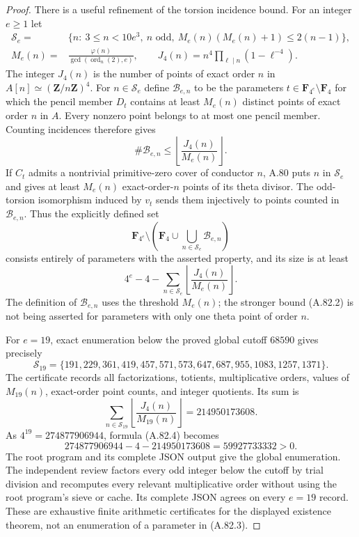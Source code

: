 \documentclass[11pt]{article}
\begin{document}
\begin{proof}
There is a useful refinement of the torsion incidence bound.
For an integer $e\ge1$ let
\[
\begin{split}
 \mathcal S_e={}&\{n:\ 3\le n<10e^3,\ n\text{ odd},\
       M_e(n)(M_e(n)+1)\le2(n-1)\},\\
 M_e(n)={}&\frac{\varphi(n)}{\gcd(\operatorname{ord}_n(2),e)},\qquad
 J_4(n)=n^4\prod_{\ell\mid n}(1-\ell^{-4}).
\end{split}                                                   \tag{A.82.1}
\]
The integer $J_4(n)$ is the number of points of exact order
$n$ in $A[n]\simeq(\mathbf Z/n\mathbf Z)^4$.
For $n\in\mathcal S_e$ define $\mathcal B_{e,n}$ to be
the parameters $t\in\mathbf F_{4^e}\setminus\mathbf F_4$
for which the pencil member $D_t$ contains at least
$M_e(n)$ distinct points of exact order $n$ in $A$.
Every nonzero point belongs to at most one pencil member.
Counting incidences therefore gives
\[
               \#\mathcal B_{e,n}
                  \le\left\lfloor\frac{J_4(n)}{M_e(n)}\right\rfloor.
                                                               \tag{A.82.2}
\]
If $C_t$ admits a nontrivial primitive-zero cover of
conductor $n$, A.80 puts $n$ in $\mathcal S_e$ and gives
at least $M_e(n)$ exact-order-$n$ points of its theta
divisor. The odd-torsion isomorphism induced by $v_t$
sends them injectively to points counted in
$\mathcal B_{e,n}$. Thus the explicitly defined set
\[
 \mathbf F_{4^e}\setminus
       \left(\mathbf F_4\cup
          \bigcup_{n\in\mathcal S_e}\mathcal B_{e,n}\right)
                                                               \tag{A.82.3}
\]
consists entirely of parameters with the asserted property,
and its size is at least
\[
       4^e-4-
       \sum_{n\in\mathcal S_e}
          \left\lfloor\frac{J_4(n)}{M_e(n)}\right\rfloor.
                                                               \tag{A.82.4}
\]
The definition of $\mathcal B_{e,n}$ uses the threshold
$M_e(n)$; the stronger bound (A.82.2) is not being asserted
for parameters with only one theta point of order $n$.

For $e=19$, exact enumeration below the proved global
cutoff $68590$ gives precisely
\[
 \mathcal S_{19}=\{191,229,361,419,457,571,573,647,687,
                         955,1083,1257,1371\}.
\]
The certificate records all factorizations, totients,
multiplicative orders, values of $M_{19}(n)$, exact-order
point counts, and integer quotients. Its sum is
\[
 \sum_{n\in\mathcal S_{19}}
      \left\lfloor\frac{J_4(n)}{M_{19}(n)}\right\rfloor
       =214950173608.
\]
As $4^{19}=274877906944$, formula (A.82.4) becomes
\[
             274877906944-4-214950173608
                     =59927733332>0.
\]
The root program 
and its complete JSON output give the global enumeration.
The independent review
factors every odd integer below the cutoff by trial division
and recomputes every relevant multiplicative order without
using the root program's sieve or cache. Its complete JSON
agrees on every $e=19$ record. These are exhaustive finite
arithmetic certificates for the displayed existence theorem,
not an enumeration of a parameter in (A.82.3).
\end{proof}
\end{document}
